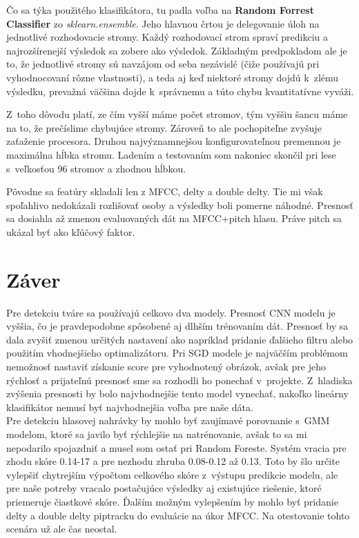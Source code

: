 \documentclass[11pt, a4paper]{article}
\begin{document}
			Čo sa týka použitého klasifikátora, tu padla voľba na \textbf{Random Forrest Classifier} zo \emph{sklearn.ensemble}. Jeho hlavnou črtou je delegovanie úloh na jednotlivé rozhodovacie stromy. Každý rozhodovací strom spraví predikciu a najrozšírenejší výsledok sa zobere ako výsledok. Základným predpokladom ale je to, že jednotlivé stromy sú navzájom od seba nezávislé (čiže používajú pri vyhodnocovaní rôzne vlastnosti), a teda aj keď niektoré stromy dojdú k~zlému výsledku, prevažná väčšina dojde k~správnemu a túto chybu kvantitatívne vyváži.
			
			Z~toho dôvodu platí, ze čím vyšší máme počet stromov, tým vyššiu šancu máme na to, že prečíslime chybujúce stromy. Zároveň to ale pochopiteľne zvyšuje zaťaženie procesora. Druhou najvýznamnejšou konfigurovateľnou premennou je maximálna hĺbka stromu.
			Ladením a testovaním som nakoniec skončil pri lese s~veľkosťou 96 stromov a zhodnou hĺbkou.

			Pôvodne sa featúry skladali len z MFCC, delty a double delty. Tie mi však spoľahlivo nedokázali rozlišovať osoby a výsledky boli pomerne náhodné. Presnosť sa dosiahla až zmenou evaluovaných dát na MFCC+pitch hlasu. Práve pitch sa ukázal byť ako kľúčový faktor.

\section{Záver}
	Pre detekciu tváre sa používajú celkovo dva modely. Presnosť CNN modelu je vyššia, čo je pravdepodobne spôsobené aj dlhším trénovaním dát. Presnosť by sa dala zvyšiť zmenou určitých nastavení ako napríklad pridanie ďalšieho filtru alebo použitím vhodnejšieho optimalizátoru. Pri SGD modele je najväčším problémom nemožnosť nastaviť získanie score pre vyhodnotený obrázok, avšak pre jeho rýchlosť a prijateľnú presnosť sme sa rozhodli ho ponechať v~projekte. Z~hladiska zvýšenia presnosti by bolo najvhodnejšie tento model vynechať, nakoľko lineárny klasifikátor nemusí byť najvhodnejšia voľba pre naše dáta. 
\\

	Pre detekciu hlasovej nahrávky by mohlo byť zaujímavé porovnanie s~GMM modelom, ktoré sa javilo byť rýchlejšie na natrénovanie, avšak to sa mi nepodarilo spojazdniť a musel som ostať pri Random Foreste. Systém vracia pre zhodu skóre 0.14-17 a pre nezhodu zhruba 0.08-0.12 až 0.13. Toto by šlo určite vylepšiť chytrejším výpočtom celkového skóre z~výstupu predikcie modelu, ale pre naše potreby vracalo postačujúce výsledky aj existujúce riešenie, ktoré priemeruje čiastkové skóre.
	Ďalším možným vylepšením by mohlo byť pridanie delty a double delty piptracku do evaluácie na úkor MFCC. Na otestovanie tohto scenára už ale čas neostal.
	
\end{document}

